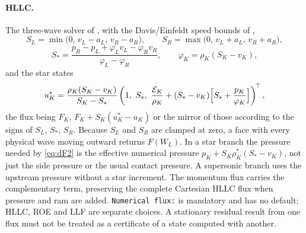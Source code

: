 \paragraph{HLLC.}
The three-wave solver of \citet{Toro1994}, with the Davis/Einfeldt speed
bounds of \citet{Batten1997},
%
\begin{equation}
  S_L = \min\bigl(0,\, v_L - a_L,\, v_R - a_R\bigr),\qquad
  S_R = \max\bigl(0,\, v_L + a_L,\, v_R + a_R\bigr),
  \label{eq:hllc_speeds}
\end{equation}
%
\begin{equation}
  S_* = \frac{p_R - p_L + \varphi_L v_L - \varphi_R v_R}{\varphi_L - \varphi_R},
  \qquad \varphi_K = \rho_K (S_K - v_K),
  \label{eq:sstar}
\end{equation}
%
and the star states
%
\begin{equation}
  u^*_K = \frac{\rho_K(S_K - v_K)}{S_K - S_*}
  \left(1,\ S_*,\
        \frac{\mathcal{E}_K}{\rho_K} + (S_* - v_K)\Bigl[S_* + \frac{p_K}{\varphi_K}\Bigr]
  \right)^{\!\top},
  \label{eq:hllc_star}
\end{equation}
%
the flux being $F_K$, $F_K + S_K(u^*_K - u_K)$ or the mirror of those
according to the signs of $S_L$, $S_*$, $S_R$.  Because $S_L$ and $S_R$ are
clamped at zero, a face with every physical wave moving outward returns
$F(W_L)$. In a star branch the pressure needed by
\eqref{eq:dF2} is the effective numerical pressure
$p_K+S_K\rho^*_K(S_* - v_K)$, not just the side pressure or the usual
contact pressure. A supersonic branch uses the upstream pressure without a
star increment. The momentum flux carries the complementary term, preserving
the complete Cartesian HLLC flux when pressure and ram are added.
\texttt{Numerical flux:} is mandatory and has no default; HLLC, ROE and LLF
are separate choices. A stationary residual result from one flux must not
be treated as a certificate of a state computed with another.

